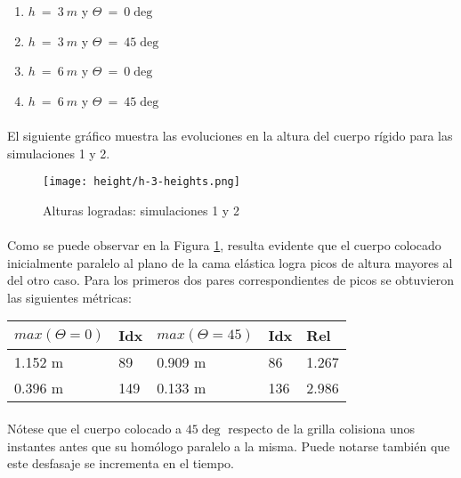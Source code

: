 \documentclass[12pt, twocolumn]{article}
\begin{document}
	\begin{enumerate}
	    \item $h\:=\:3\:m$ y $\Theta\:=\:0\deg$
	    \item $h\:=\:3\:m$ y $\Theta\:=\:45\deg$
	    \item $h\:=\:6\:m$ y $\Theta\:=\:0\deg$
	    \item $h\:=\:6\:m$ y $\Theta\:=\:45\deg$
	\end{enumerate}
	
	\paragraph{} El siguiente gráfico muestra las evoluciones en la altura del cuerpo rígido para las simulaciones 1 y 2.
	
    \begin{figure}[H]
		\centering
		\texttt{[image: height/h-3-heights.png]}
		\caption{Alturas logradas: simulaciones 1 y 2}
		\label{h3}
	\end{figure}
	
	\paragraph{} Como se puede observar en la Figura \ref{h3}, resulta evidente que el cuerpo colocado inicialmente paralelo al plano de la cama elástica logra picos de altura mayores al del otro caso. Para los primeros dos pares correspondientes de picos se obtuvieron las siguientes métricas:
	
    \begin{table}[H]
    \begin{tabular}{@{}lllll@{}}
    \toprule
    $max(\Theta = 0)$ & Idx & $max(\Theta = 45)$ & Idx & Rel    \\ \midrule
    1.152 m           & 89  & 0.909 m            & 86  & 1.267 \\
    0.396 m           & 149 & 0.133 m            & 136 & 2.986 \\ \bottomrule
    \end{tabular}
    \end{table}
	
	\paragraph{} Nótese que el cuerpo colocado a $45\deg$ respecto de la grilla colisiona unos instantes antes que su homólogo paralelo a la misma. Puede notarse también que este desfasaje se incrementa en el tiempo. 
	
\end{document}
